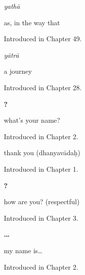 \noindent\begin{minipage}[t]{\linewidth}
\raggedright
\textbf{}\enspace\emph{yathā}\par
\small as, in the way that\par
\footnotesize Introduced in Chapter 49.
\end{minipage}\par\medskip

\noindent\begin{minipage}[t]{\linewidth}
\raggedright
\textbf{}\enspace\emph{yātrā}\par
\small a journey\par
\footnotesize Introduced in Chapter 28.
\end{minipage}\par\medskip

\noindent\begin{minipage}[t]{\linewidth}
\raggedright
\textbf{  ?}\par
\small what's your name?\par
\footnotesize Introduced in Chapter 2.
\end{minipage}\par\medskip

\noindent\begin{minipage}[t]{\linewidth}
\raggedright
\textbf{}\par
\small thank you (dhanyavādaḥ)\par
\footnotesize Introduced in Chapter 1.
\end{minipage}\par\medskip

\noindent\begin{minipage}[t]{\linewidth}
\raggedright
\textbf{  ?}\par
\small how are you? (respectful)\par
\footnotesize Introduced in Chapter 3.
\end{minipage}\par\medskip

\noindent\begin{minipage}[t]{\linewidth}
\raggedright
\textbf{  … }\par
\small my name is…\par
\footnotesize Introduced in Chapter 2.
\end{minipage}\par\medskip
